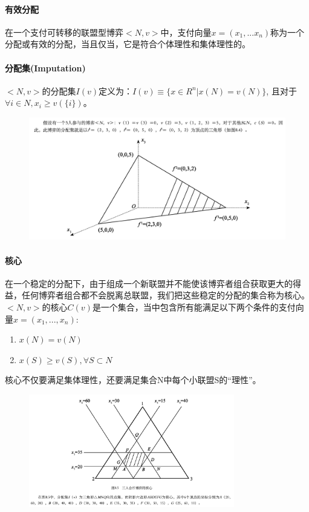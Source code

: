\documentclass[12pt,a4paper]{article}
\begin{document}
\paragraph{有效分配} 在一个支付可转移的联盟型博弈$<N,v>$中，支付向量$x = (x_1,...x_n)$称为一个分配或有效的分配，当且仅当，它是符合个体理性和集体理性的。

\paragraph{分配集(Imputation)} $<N,v>$的分配集$I(v)$定义为：$I(v) \equiv \{ x \in R^n|x(N)=v(N)\}$, 且对于$\forall i \in N, x_i \geq v(\{i\})$。
\begin{figure}[H]
	\centering
	\includegraphics[width=1.0\textwidth]{../images/game-theory-imputation.png}
	\caption{}
	\label{}
\end{figure}

\paragraph{核心} 在一个稳定的分配下，由于组成一个新联盟并不能使该博弈者组合获取更大的得益，任何博弈者组合都不会脱离总联盟，我们把这些稳定的分配的集合称为核心。$<N,v>$的核心$C(v)$是一个集合，当中包含所有能满足以下两个条件的支付向量$x=(x_1,...,x_n)$:
\begin{enumerate}
	\item $x(N)=v(N)$
	\item $x(S) \geq v(S),\forall S \subset N$
\end{enumerate}
核心不仅要满足集体理性，还要满足集合N中每个小联盟S的“理性”。
\begin{figure}[H]
	\centering
	\includegraphics[width=0.8\textwidth]{../images/game-theory-core.png}
	\caption{}
	\label{}
\end{figure}
\end{document}
